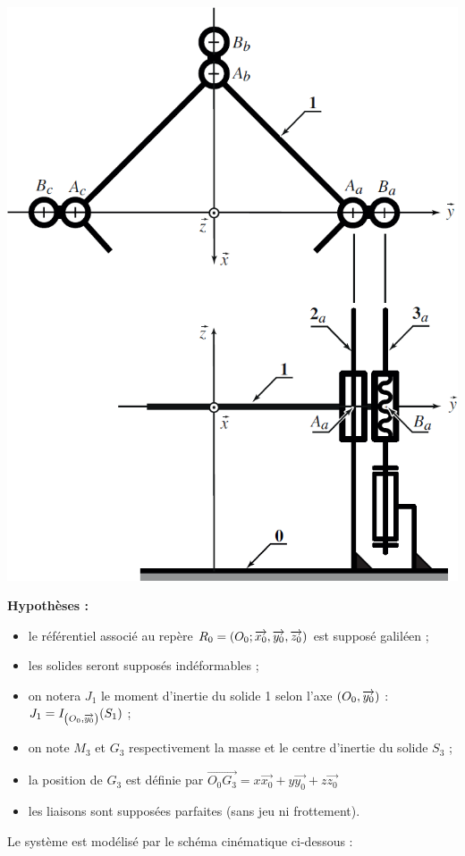 \documentclass[10pt,fleqn]{article} %
\begin{document}
\begin{multicols}{2}
\begin{multicols}{2}
\begin{center}
\includegraphics[width=.8\linewidth]{images/fig_04}
\end{center}


\textbf{Hypothèses :}
\begin{itemize}
\item le référentiel associé au repère $R_0=\left(O_0;\overrightarrow{x_0},\overrightarrow{y_0},\overrightarrow{z_0} \right)$ est supposé galiléen ;
\item les solides seront supposés indéformables ; 
\item on notera $J_1$ le moment d'inertie du solide 1 selon l'axe $\left(O_0,\overrightarrow{y_0}\right)$ : $J_1=I_{\left(O_0,\overrightarrow{y_0}\right)}(S_1)$ ;
\item on note $M_3$ et $G_3$ respectivement la masse et le centre d'inertie du solide $S_3$ ;
\item la position de $G_3$ est définie par $\overrightarrow{O_0G_3}=x\overrightarrow{x_0}+y \overrightarrow{y_0}+z \overrightarrow{z_0}$
\item les liaisons sont supposées parfaites (sans jeu ni frottement).
\end{itemize}

Le système est modélisé par le schéma cinématique ci-dessous :


\end{multicols}
\end{multicols}
\end{document}
